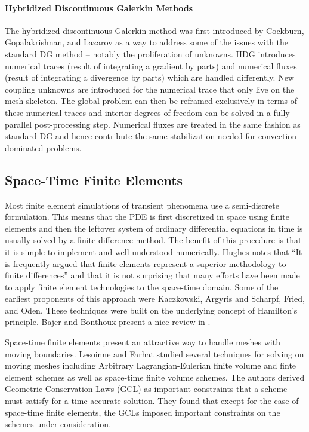 \documentclass[Dissertation.tex]{subfiles}
\begin{document}
\paragraph*{Hybridized Discontinuous Galerkin Methods}
The hybridized discontinuous Galerkin method was first introduced by Cockburn, Gopalakrishnan, and Lazarov\cite{HDG}
as a way to address some of the issues with the standard DG method
-- notably the proliferation of unknowns.
HDG introduces numerical traces (result of integrating a gradient by parts) and numerical fluxes (result of integrating a divergence by parts)
which are handled differently.
New coupling unknowns are introduced for the numerical trace that only live on the mesh skeleton.
The global problem can then be reframed exclusively in terms of these numerical traces and interior degrees of freedom
can be solved in a fully parallel post-processing step.
Numerical fluxes are treated in the same fashion as standard DG and hence contribute the same stabilization needed for convection dominated problems.

\subsection{Space-Time Finite Elements}
Most finite element simulations of transient phenomena use a semi-discrete formulation.
This means that the PDE is first discretized in space using finite elements and then the leftover system of ordinary differential equations in time
is usually solved by a finite difference method.
The benefit of this procedure is that it is simple to implement and well understood numerically.
Hughes\cite{HughesSpaceTimeElastoDynamics} notes that
``It is frequently argued that finite elements represent a superior methodology to finite differences''
and that it is not surprising that many efforts have been made to apply finite element technologies to the space-time domain.
Some of the earliest proponents of this approach were Kaczkowski\cite{Kaczkowski1975},
Argyris and Scharpf\cite{ArgyrisSpaceTime}, Fried\cite{FriedSpaceTime}, and Oden\cite{OdenSpaceTime}.
These techniques were built on the underlying concept of Hamilton's principle.
Bajer and Bonthoux present a nice review in \cite{Bonthoux1991}.

Space-time finite elements present an attractive way to handle meshes with moving boundaries.
Lesoinne and Farhat\cite{GCL} studied several techniques for solving on moving meshes including Arbitrary Lagrangian-Eulerian
finite volume and finte element schemes as well as space-time finite volume schemes.
The authors derived Geometric Conservation Laws (GCL) as important constraints that a scheme must satisfy for a time-accurate solution.
They found that except for the case of space-time finite elements, the GCLs imposed important constraints on the schemes under consideration.
\end{document}
